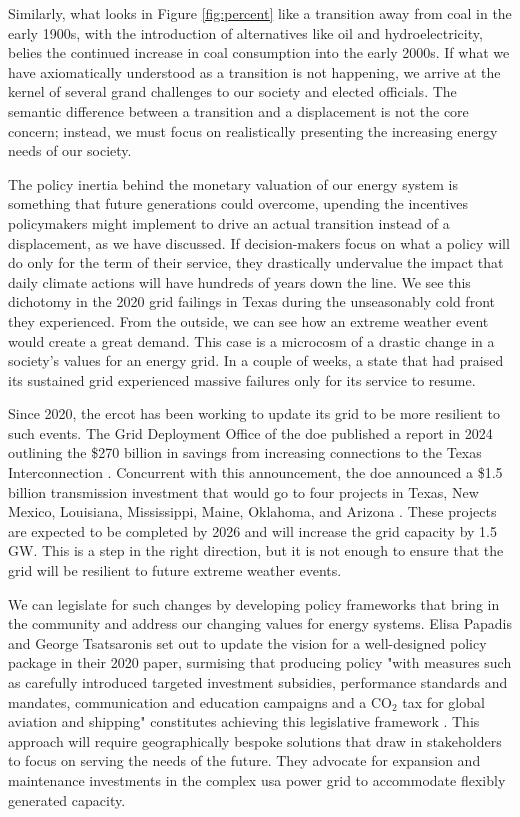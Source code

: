 Similarly, what looks in Figure \ref{fig:percent} like a transition away from
coal in the early 1900s, with the introduction of alternatives like oil and
hydroelectricity, belies the continued increase in coal consumption into the
early 2000s. If what we have axiomatically understood as a transition is not
happening, we arrive at the kernel of several grand challenges to our society
and elected officials. The semantic difference between a transition and a
displacement is not the core concern; instead, we must focus on realistically
presenting the increasing energy needs of our society.

The policy inertia behind the monetary valuation of our energy system is
something that future generations could overcome, upending the incentives
policymakers might implement to drive an actual transition instead of a
displacement, as we have discussed. If decision-makers focus on what a policy
will do only for the term of their service, they drastically undervalue the
impact that daily climate actions will have hundreds of years down the line. We
see this dichotomy in the 2020 grid failings in Texas during the unseasonably
cold front they experienced. From the outside, we can see how an extreme
weather event would create a great demand. This case is a microcosm of a drastic change in a society's values for an energy grid. In a
couple of weeks, a state that had praised its sustained grid
\cite{texas_ercot_nodate} experienced massive failures only for its
service to resume.

Since 2020, the \gls{ercot} has been working to update its grid to be more
resilient to such events. The Grid Deployment Office of the \gls{doe} published a report in 2024 outlining the \$270 billion in savings from increasing connections to the Texas Interconnection
\cite{doe_transmission_planning_study_2024}. Concurrent with this announcement,
the \gls{doe} announced a \$1.5 billion transmission investment that would go to
four projects in Texas, New Mexico, Louisiana, Mississippi, Maine, Oklahoma,
and Arizona \cite{doe_tran_announce_2024}. These projects are expected to be
completed by 2026 and will increase the grid capacity by 1.5 GW. This is
a step in the right direction, but it is not enough to ensure that the grid
will be resilient to future extreme weather events.

We can legislate for such changes by developing policy frameworks that bring in
the community and address our changing values for energy systems. Elisa Papadis and George Tsatsaronis set out to update the vision for a well-designed policy package in their 2020 paper, surmising that producing policy "with measures such as carefully introduced targeted investment subsidies, performance standards and mandates, communication and education campaigns and a CO$_2$ tax for global aviation and shipping" constitutes achieving this legislative framework \cite{papadis_challenges_2020}. This approach will require geographically bespoke solutions that draw in stakeholders to focus on serving the needs of the future. They advocate for expansion and maintenance investments in the complex \gls{usa} power grid to accommodate flexibly generated capacity.

